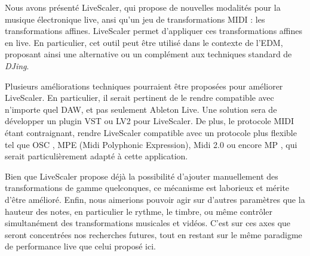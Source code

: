 Nous avons présenté LiveScaler, qui propose de nouvelles modalités pour la musique électronique live, ansi qu'un jeu de transformations MIDI : les transformations affines.  Live\-Scaler permet d'appliquer ces transformations affines en live. En particulier, cet outil peut être utilisé dans le contexte de l'EDM, proposant ainsi une alternative ou un complément aux techniques standard de \emph{DJing}.

Plusieurs améliorations techniques pourraient être proposées pour améliorer LiveScaler. En particulier, il serait pertinent de le rendre compatible avec n'importe quel DAW, et pas seulement Ableton Live. Une solution sera de  développer un plugin VST ou LV2 pour LiveScaler. De plus, le protocole MIDI étant contraignant, rendre LiveScaler compatible avec un protocole plus flexible tel que OSC \cite{wright2005open}, MPE (Midi Polyphonic Expression), Midi 2.0 ou encore  MP \cite{goudard2017mapping}, qui serait particulièrement adapté à cette application.

Bien que LiveScaler propose déjà la possibilité d'ajouter manuellement des transformations de gamme quelconques, ce mécanisme est laborieux et mérite d'être amélioré. Enfin, nous aimerions pouvoir agir sur d'autres paramètres que la hauteur des notes, en particulier le rythme, le timbre, ou même contrôler simultanément des transformations musicales et vidéos. C'est sur ces axes que seront concentrées nos recherches futures, tout en restant sur le même paradigme de performance live que celui proposé ici.
